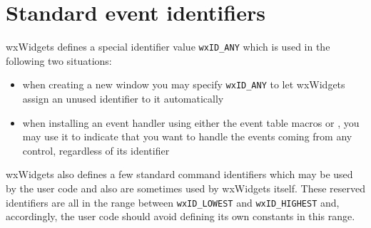 \section{Standard event identifiers}\label{stdevtid}

wxWidgets defines a special identifier value {\tt wxID\_ANY} which is used in
the following two situations:

\begin{itemize}
\item when creating a new window you may specify {\tt wxID\_ANY} to let
wxWidgets assign an unused identifier to it automatically
\item when installing an event handler using either the event table
macros or ,
you may use it to indicate that you want to handle the events
coming from any control, regardless of its identifier
\end{itemize}

wxWidgets also defines a few standard command identifiers which may be used by
the user code and also are sometimes used by wxWidgets itself. These reserved
identifiers are all in the range between {\tt wxID\_LOWEST} and 
{\tt wxID\_HIGHEST} and, accordingly, the user code should avoid defining its
own constants in this range.

